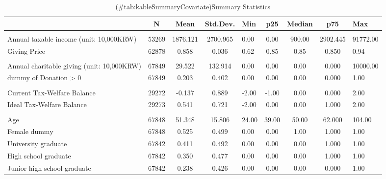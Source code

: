 \documentclass[
]{article}
\begin{document}
\begin{table}

\caption{(\#tab:kableSummaryCovariate)Summary Statistics}
\centering
\fontsize{7}{9}\selectfont
\begin{tabular}[t]{lccclcccl}
\toprule
 & N & Mean & Std.Dev. & Min & p25 & Median & p75 & Max\\
\midrule
\addlinespace[0.3em]
\multicolumn{9}{l}{\textbf{Income and Giving Price}}\\
\hspace{1em}Annual taxable income (unit: 10,000KRW) & 53269 & 1876.121 & 2700.965 & 0.00 & 0.00 & 900.00 & 2902.445 & 91772.00\\
\hspace{1em}Giving Price & 62878 & 0.858 & 0.036 & 0.62 & 0.85 & 0.85 & 0.850 & 0.94\\
\addlinespace[0.3em]
\multicolumn{9}{l}{\textbf{Charitable Donations}}\\
\hspace{1em}Annual charitable giving (unit: 10,000KRW) & 67849 & 29.522 & 132.914 & 0.00 & 0.00 & 0.00 & 0.000 & 10000.00\\
\hspace{1em}dummy of Donation > 0 & 67849 & 0.203 & 0.402 & 0.00 & 0.00 & 0.00 & 0.000 & 1.00\\
\addlinespace[0.3em]
\multicolumn{9}{l}{\textbf{Government Efficiency}}\\
\hspace{1em}Current Tax-Welfare Balance & 29272 & -0.137 & 0.889 & -2.00 & -1.00 & 0.00 & 0.000 & 2.00\\
\hspace{1em}Ideal Tax-Welfare Balance & 29273 & 0.541 & 0.721 & -2.00 & 0.00 & 0.00 & 1.000 & 2.00\\
\addlinespace[0.3em]
\multicolumn{9}{l}{\textbf{Individual Characteristics}}\\
\hspace{1em}Age & 67848 & 51.348 & 15.806 & 24.00 & 39.00 & 50.00 & 62.000 & 104.00\\
\hspace{1em}Female dummy & 67848 & 0.525 & 0.499 & 0.00 & 0.00 & 1.00 & 1.000 & 1.00\\
\hspace{1em}University graduate & 67842 & 0.411 & 0.492 & 0.00 & 0.00 & 0.00 & 1.000 & 1.00\\
\hspace{1em}High school graduate & 67842 & 0.350 & 0.477 & 0.00 & 0.00 & 0.00 & 1.000 & 1.00\\
\hspace{1em}Junior high school graduate & 67842 & 0.238 & 0.426 & 0.00 & 0.00 & 0.00 & 0.000 & 1.00\\
\bottomrule
\end{tabular}
\end{table}
\end{document}
